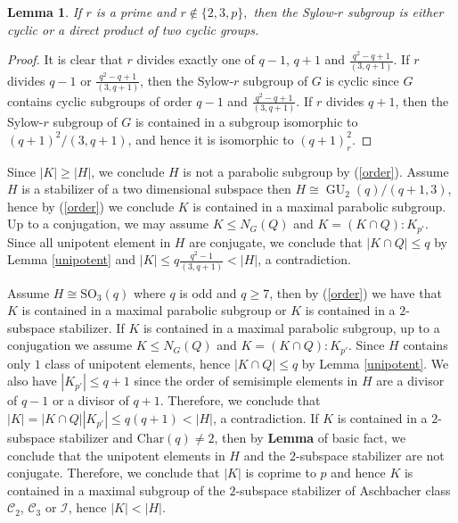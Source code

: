 \documentclass[12pt,reqno]{amsart}
\newcommand{\GU}{\operatorname{GU}}
\theoremstyle{plain}
\newtheorem{lemma}[proposition]{Lemma}
\theoremstyle{definition}
\begin{document}
  \begin{lemma}\label{Syl-r}
  	If $r$ is a prime and $r\notin\{2,3,p \},$ then the Sylow-$r$ subgroup is either cyclic or a direct product of two cyclic groups.
  \end{lemma}
  \begin{proof}
  	It is clear that $r$ divides exactly one of $q-1$, $q+1$ and $\frac{q^2-q+1}{(3,q+1)}.$ If $r$ divides $q-1$ or $\frac{q^2-q+1}{(3,q+1)}$, then the Sylow-$r$ subgroup of $G$ is cyclic since $G$ contains cyclic subgroups of order $q-1$ and $\frac{q^2-q+1}{(3,q+1)}.$
  	If $r$ divides $q+1$, then the Sylow-$r$ subgroup of $G$ is contained in a subgroup isomorphic to $(q+1)^2/(3,q+1)$, and hence it is isomorphic to $(q+1)_r^2.$
  \end{proof}
  Since $|K|\ge |H|$, we conclude $H$ is not a parabolic subgroup by (\ref{order}).
  Assume $H$ is a stabilizer of a two dimensional subspace then $H\cong \GU_2(q)/(q+1,3)$, hence by (\ref{order}) we conclude $K$ is contained in a maximal parabolic subgroup.
  Up to a conjugation, we may assume $K\le N_G(Q)$ and $K=(K\cap Q){:}K_{p'}$.
  Since all unipotent element in $H$ are conjugate, we conclude that $|K\cap Q|\le q$ by Lemma \ref{unipotent} and $|K|\le q\frac{q^2-1}{(3,q+1)}<|H|$, a contradiction.
  
  Assume $H\cong \mathrm{SO}_3(q)$ where $q$ is odd and $q\ge 7$, then by (\ref{order}) we have that $K$ is contained in a maximal parabolic subgroup or $K$ is contained in a $2$-subspace stabilizer.
  If $K$ is contained in a maximal parabolic subgroup, up to a conjugation we assume $K\le N_G(Q)$ and $K=(K\cap Q){:}K_{p'}$. 
  Since $H$ contains only $1$ class of unipotent elements, hence $|K\cap Q|\le q$ by Lemma \ref{unipotent}. We also have $|K_{p'}|\le q+1$ since the order of semisimple elements in $H$ are a divisor of $q-1$ or a divisor of $q+1$. 
  Therefore, we conclude that $|K|=|K\cap Q||K_{p'}|\le q(q+1)< |H|$, a contradiction.
  If $K$ is contained in a $2$-subspace stabilizer and $\mathrm{Char}(q)\neq 2$, then by \textbf{Lemma} of basic fact, we conclude that the unipotent elements in $H$ and the $2$-subspace stabilizer are not conjugate.
  Therefore, we conclude that $|K|$ is coprime to $p$ and hence $K$ is contained in a maximal subgroup of the $2$-subspace stabilizer of Aschbacher class $\mathcal{C}_2$, $\mathcal{C}_3$ or $\mathcal{I}$, hence $|K|<|H|$. 
  
\end{document}
